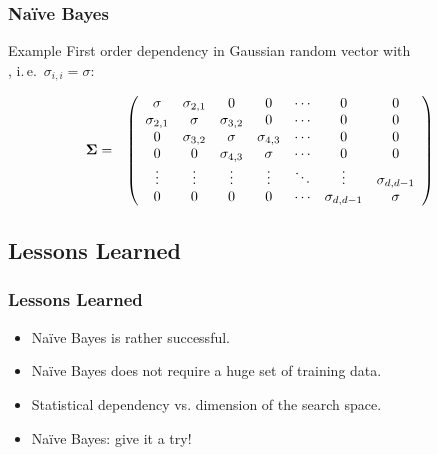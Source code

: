 \begin{frame}
  \frametitle{Na{\"i}ve Bayes \cont}

  \begin{ovalblock}{Example}
    First order dependency in Gaussian random vector with \\
    , i.\,e.\ $\sigma_{i,i}=\sigma$:
 
   \begin{eqnarray*}
     {\bm \Sigma} &=& \left(
       \begin{array}{ccccccc}
         \sigma       & \sigma_{2,1} & 0            & 0            & \cdots & 0              & 0 \\
         \sigma_{2,1} & \sigma       & \sigma_{3,2} & 0            & \cdots & 0              & 0 \\
         0            & \sigma_{3,2} & \sigma       & \sigma_{4,3} & \cdots & 0              & 0 \\
         0            & 0            & \sigma_{4,3} & \sigma       & \cdots & 0              & 0 \\
         \vdots       & \vdots       & \vdots       & \vdots       & \ddots & \vdots         & \sigma_{d,d-1} \\
         0            & 0            & 0            & 0            & \cdots & \sigma_{d,d-1} & \sigma \\
       \end{array}
     \right)
    \end{eqnarray*}
  \end{ovalblock}
\end{frame}


\subsection{Lessons Learned}

\begin{frame}
  \frametitle{Lessons Learned}

  \begin{itemize}
    \item Na{\"i}ve Bayes is rather successful. \\[.5cm]
    \item Na{\"i}ve Bayes does not require a huge set of training data. \\[.5cm]
    \item Statistical dependency vs. dimension of the search space. \\[.5cm]
    \item Na{\"i}ve Bayes: give it a try!
  \end{itemize}
\end{frame}


